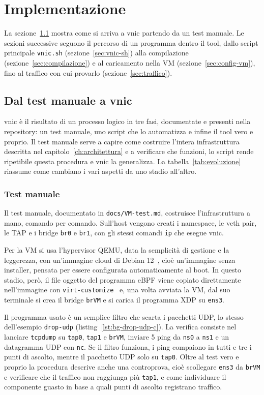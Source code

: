 \chapter{Implementazione}\label{ch:implementazione}

La sezione~\ref{sec:processo} mostra come si arriva a vnic partendo da un test manuale. Le sezioni successive seguono il percorso di un programma dentro il tool, dallo script principale \texttt{vnic.sh} (sezione~\ref{sec:vnic-sh}) alla compilazione (sezione~\ref{sec:compilazione}) e al caricamento nella VM (sezione~\ref{sec:config-vm}), fino al traffico con cui provarlo (sezione~\ref{sec:traffico}).

\section{Dal test manuale a vnic}\label{sec:processo}

vnic è il risultato di un processo logico in tre fasi, documentate e presenti nella repository: un test manuale, uno script che lo automatizza e infine il tool vero e proprio. Il test manuale serve a capire come costruire l'intera infrastruttura descritta nel capitolo~\ref{ch:architettura} e a verificare che funzioni, lo script rende ripetibile questa procedura e vnic la generalizza. La tabella~\ref{tab:evoluzione} riassume come cambiano i vari aspetti da uno stadio all'altro.

\subsection{Test manuale}

Il test manuale, documentato in \texttt{docs/VM-test.md}, costruisce l'infrastruttura a mano, comando per comando. Sull'host vengono creati i namespace, le veth pair, le TAP e i bridge \texttt{br0} e \texttt{br1}, con gli stessi comandi \texttt{ip} che esegue vnic.

Per la VM si usa l'hypervisor QEMU, data la semplicità di gestione e la leggerezza, con un'immagine cloud di Debian 12~\cite{debian-cloud}, cioè un'immagine senza installer, pensata per essere configurata automaticamente al boot. In questo stadio, però, il file oggetto del programma eBPF viene copiato direttamente nell'immagine con \texttt{virt-customize}~\cite{virt-customize} e, una volta avviata la VM, dal suo terminale si crea il bridge \texttt{brVM} e si carica il programma XDP su \texttt{ens3}.

Il programma usato è un semplice filtro che scarta i pacchetti UDP, lo stesso dell'esempio \texttt{drop-udp} (listing~\ref{lst:bg-drop-udp-c}). La verifica consiste nel lanciare \texttt{tcpdump} su \texttt{tap0}, \texttt{tap1} e \texttt{brVM}, inviare 5 ping da \texttt{ns0} a \texttt{ns1} e un datagramma UDP con \texttt{nc}. Se il filtro funziona, i ping compaiono in tutti e tre i punti di ascolto, mentre il pacchetto UDP solo su \texttt{tap0}. Oltre al test vero e proprio la procedura descrive anche una controprova, cioè scollegare \texttt{ens3} da \texttt{brVM} e verificare che il traffico non raggiunga più \texttt{tap1}, e come individuare il componente guasto in base a quali punti di ascolto registrano traffico.

